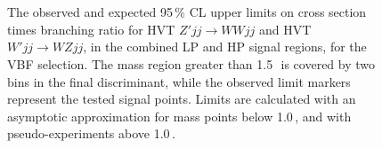 \begin{figure}[H]
\centering
{}\\
\\
\caption[Observed and expected upper limits for HVT $Z'$ and $W'$ model (vector boson fusion selection)]{The observed and expected 95\,\% CL upper limits on cross section times branching ratio for \protect{} HVT $Z' jj\rightarrow WWjj$ and \protect{} HVT $W'jj \rightarrow WZjj$, in the combined LP and HP signal regions, for the VBF selection. The mass region greater than 1.5\,\TeV\, is covered by two bins in the final discriminant, while the observed limit markers represent the tested signal points. Limits are calculated with an asymptotic approximation for mass points below 1.0\,\TeV, and with pseudo-experiments above 1.0\,\TeV.}
\label{fig:lim_VBF_HVT}
\end{figure}
